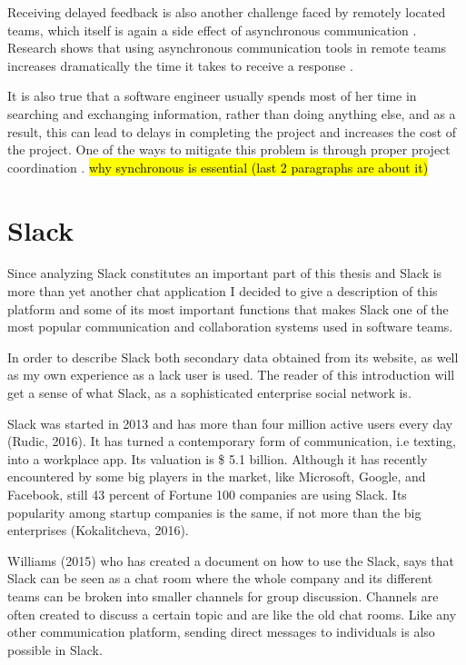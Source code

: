Receiving delayed feedback is also another challenge faced by remotely located teams, which itself is again a side effect of asynchronous communication \citep{conchuir2006exploring,holmstrom2006agile}. Research shows that using asynchronous communication tools in remote teams increases dramatically the time it takes to receive a response \citep{holmstrom2006global}. 

It is also true that a software engineer usually spends most of her time in searching and exchanging information, rather than doing anything else, and as a result, this can lead to delays in completing the project and increases the cost of the project. One of the ways to mitigate this problem is through proper project coordination \citep{dumitriu2006issues}. \hl{why synchronous is essential (last 2 paragraphs are about it)}

\section{Slack}
Since analyzing Slack constitutes an important part of this thesis and Slack is more than yet another chat application I decided to give a description of this platform and some of its most important functions that makes Slack one of the most popular communication and collaboration systems used in software teams.

In order to describe Slack both secondary data obtained from its website, as well as my own experience as a lack user is used. The reader of this introduction will get a sense of what Slack, as a sophisticated enterprise social network is.

Slack was started in 2013 and has more than four million active users every day (Rudic, 2016). It has turned a contemporary form of communication, i.e texting, into a workplace app. Its valuation is \$ 5.1 billion. Although it has recently encountered by some big players in the market, like Microsoft, Google, and Facebook, still 43 percent of Fortune 100 companies are using Slack. Its popularity among startup companies is the same, if not more than the big enterprises (Kokalitcheva, 2016).

Williams (2015) who has created a document on how to use the Slack, says that Slack can be seen as a chat room where the whole company and its different teams can be broken into smaller channels for group discussion. Channels are often created to discuss a certain topic and are like the old chat rooms. Like any other communication platform, sending direct messages to individuals is also possible in Slack.

